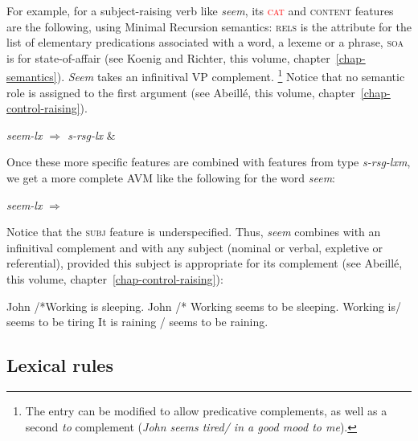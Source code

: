 \documentclass[output=paper
	        ,collection
	        ,collectionchapter
 	        ,biblatex
                ,babelshorthands
                ,newtxmath
                ,draftmode
                ,colorlinks, citecolor=brown
]{langscibook}
\begin{document}
For example, for a subject-raising verb like \emph{seem}, its \textcolor{red}{\textsc{cat}} and \textsc{content} features are the following, using Minimal Recursion semantics: \textsc{rels} is the attribute for the list of elementary predications associated with a word, a lexeme or a phrase, \textsc{soa} is for state-of-affair (see Koenig and Richter, this volume, chapter~\ref{chap-semantics}). \emph{Seem} takes an infinitival VP complement.%
%
\footnote{The entry can be modified to allow predicative complements, as well as a second \emph{to} complement (\emph{John seems tired/ in a good mood to me}).}
%
Notice that no semantic role is assigned to the first argument (see Abeillé, this volume, chapter~\ref{chap-control-raising}).

\ea\label{ex:prop23}
\emph{seem-lx $\Rightarrow$ s-rsg-lx} \&
\z

Once these more specific features are combined with features from type \emph{s-rsg-lxm}, we get a more complete AVM like the following for the word \emph{seem}:

\ea\label{ex:prop24}
\emph{seem-lx} $\Rightarrow$
\z

Notice that the \textsc{subj} feature is underspecified. Thus, \emph{seem} combines with an infinitival complement and with any subject (nominal or verbal, expletive or referential), provided this subject is appropriate for its complement (see Abeillé, this volume, chapter~\ref{chap-control-raising}):

\ea\label{ex:prop25}
	\ea John /*Working is sleeping.
	\ex John /* Working seems to be sleeping.
	\ex Working is/ seems to be tiring
	\ex It is raining / seems to be raining.
	\z
\z

\subsection{Lexical rules}
\end{document}
